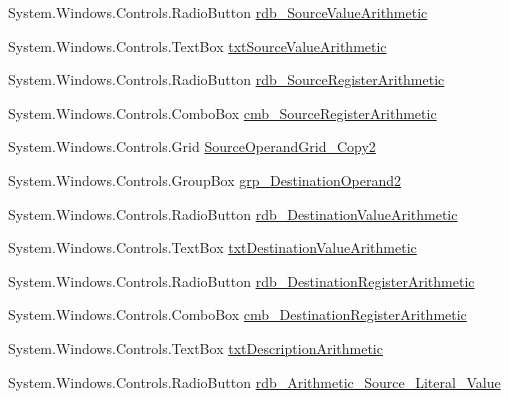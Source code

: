 \begin{DoxyCompactItemize}
\item 
System.\+Windows.\+Controls.\+Radio\+Button \hyperlink{class_c_p_u___o_s___simulator_1_1_instructions_window_a627e9cbe7e0cb2ce0f109f2345e19b73}{rdb\+\_\+\+Source\+Value\+Arithmetic}
\item 
System.\+Windows.\+Controls.\+Text\+Box \hyperlink{class_c_p_u___o_s___simulator_1_1_instructions_window_afc01788dc74f761b6cce800975394d2e}{txt\+Source\+Value\+Arithmetic}
\item 
System.\+Windows.\+Controls.\+Radio\+Button \hyperlink{class_c_p_u___o_s___simulator_1_1_instructions_window_ad571b65d5fe87bdb079c807dcac0680f}{rdb\+\_\+\+Source\+Register\+Arithmetic}
\item 
System.\+Windows.\+Controls.\+Combo\+Box \hyperlink{class_c_p_u___o_s___simulator_1_1_instructions_window_aad493dd174601ec265d5ad261f33d525}{cmb\+\_\+\+Source\+Register\+Arithmetic}
\item 
System.\+Windows.\+Controls.\+Grid \hyperlink{class_c_p_u___o_s___simulator_1_1_instructions_window_a6a57e0ae92b85cd619ef3d879ef0c628}{Source\+Operand\+Grid\+\_\+\+Copy2}
\item 
System.\+Windows.\+Controls.\+Group\+Box \hyperlink{class_c_p_u___o_s___simulator_1_1_instructions_window_adc32bbf0f47985507d606abb4862072f}{grp\+\_\+\+Destination\+Operand2}
\item 
System.\+Windows.\+Controls.\+Radio\+Button \hyperlink{class_c_p_u___o_s___simulator_1_1_instructions_window_a2e87a90d55ec015190b55bd06c273efc}{rdb\+\_\+\+Destination\+Value\+Arithmetic}
\item 
System.\+Windows.\+Controls.\+Text\+Box \hyperlink{class_c_p_u___o_s___simulator_1_1_instructions_window_adac073cb591b15be22d041695ff498e4}{txt\+Destination\+Value\+Arithmetic}
\item 
System.\+Windows.\+Controls.\+Radio\+Button \hyperlink{class_c_p_u___o_s___simulator_1_1_instructions_window_a40ebdc8941fbd7ae75ca6d14d1153569}{rdb\+\_\+\+Destination\+Register\+Arithmetic}
\item 
System.\+Windows.\+Controls.\+Combo\+Box \hyperlink{class_c_p_u___o_s___simulator_1_1_instructions_window_ad1fafd2bef9ad3f94fab585ea58fc38c}{cmb\+\_\+\+Destination\+Register\+Arithmetic}
\item 
System.\+Windows.\+Controls.\+Text\+Box \hyperlink{class_c_p_u___o_s___simulator_1_1_instructions_window_a31ef64d4c64f9791d6b4aad95cd4d95f}{txt\+Description\+Arithmetic}
\item 
System.\+Windows.\+Controls.\+Radio\+Button \hyperlink{class_c_p_u___o_s___simulator_1_1_instructions_window_ac5edaf4f68c986f0a79e9587290339f4}{rdb\+\_\+\+Arithmetic\+\_\+\+Source\+\_\+\+Literal\+\_\+\+Value}

\end{DoxyCompactItemize}
